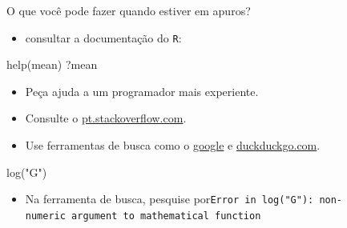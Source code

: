 \documentclass[
  10pt,
  ignorenonframetext,
]{beamer}
\newenvironment{Shaded}{}{}
\newcommand{\KeywordTok}[1]{\textcolor[rgb]{0.00,0.00,1.00}{#1}}
\newcommand{\NormalTok}[1]{#1}
\newcommand{\StringTok}[1]{\textcolor[rgb]{0.00,0.50,0.50}{#1}}
\providecommand{\tightlist}{%
  \setlength{\itemsep}{0pt}\setlength{\parskip}{0pt}}
\begin{document}
\begin{frame}[fragile]{O que você pode fazer quando estiver em apuros?}
\protect\hypertarget{o-que-vocuxea-pode-fazer-quando-estiver-em-apuros}{}
\begin{itemize}
\tightlist
\item
  consultar a documentação do \texttt{R}:
\end{itemize}

\begin{Shaded}
\begin{Highlighting}[]
\KeywordTok{help}\NormalTok{(mean)}
\NormalTok{?mean}
\end{Highlighting}
\end{Shaded}

\begin{itemize}
\tightlist
\item
  Peça ajuda a um programador mais experiente.
\item
  Consulte o \href{https://pt.stackoverflow.com/}{pt.stackoverflow.com}.
\item
  Use ferramentas de busca como o
  \href{https://www.google.com.br/}{google} e
  \href{https://duckduckgo.com/}{duckduckgo.com}.
\end{itemize}

\begin{Shaded}
\begin{Highlighting}[]
\KeywordTok{log}\NormalTok{(}\StringTok{"G"}\NormalTok{)}
\end{Highlighting}
\end{Shaded}

\begin{itemize}
\tightlist
\item
  Na ferramenta de busca, pesquise
  por\newline \texttt{Error\ in\ log("G"):\ non-numeric\ argument\ to\ mathematical\ function}
\end{itemize}
\end{frame}
\end{document}

